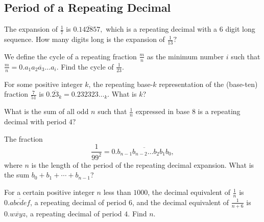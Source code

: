 \documentclass[mast]{lucky}
\begin{document}
\subsection{Period of a Repeating Decimal}
\begin{prob}[]{2}
The expansion of $\frac{1}{7}$ is $0.\overline{142857},$ which is a repeating decimal with a $6$ digit long sequence. How many digits long is the expansion of $\frac{1}{13}?$
\end{prob}

\begin{prob}[]{3}
We define the cycle of a repeating fraction $\tfrac{m}{n}$ as the minimum number $i$ such that $\tfrac{m}{n} = 0.\overline{a_1a_2a_3\dots a_i}$. Find the cycle of $\tfrac{1}{23}$.
\end{prob}

\begin{prob}[AMC 10A 2019/18]{3}
For some positive integer $k$, the repeating base-$k$ representation of the (base-ten) fraction $\frac{7}{51}$ is $0.\overline{23}_k = 0.232323\ldots_k$. What is $k$?
\end{prob}

\begin{req}{4}
What is the sum of all odd $n$ such that $\frac{1}{n}$ expressed in base $8$ is a repeating decimal with period $4?$
\end{req}

\begin{prob}[AMC 12A 2014/23]{6}
The fraction\[\dfrac1{99^2}=0.\overline{b_{n-1}b_{n-2}\ldots b_2b_1b_0},\]where $n$ is the length of the period of the repeating decimal expansion. What is the sum $b_0+b_1+\cdots+b_{n-1}$?
\end{prob}

\begin{prob}[AMC 12B 2016/22]{6}
For a certain positive integer $n$ less than $1000$, the decimal equivalent of $\frac{1}{n}$ is $0.\overline{abcdef}$, a repeating decimal of period $6$, and the decimal equivalent of $\frac{1}{n+6}$ is $0.\overline{wxyz}$, a repeating decimal of period $4$. Find $n.$
\end{prob}
\end{document}
